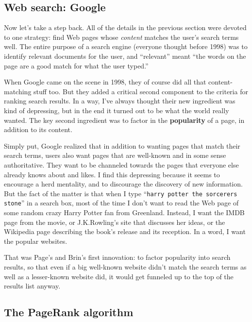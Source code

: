 \begin{alttitles}
\subsection{Web search: Google}

Now let's take a step back. All of the details in the previous section were
devoted to one strategy: find Web pages whose \textit{content} matches the
user's search terms well. The entire purpose of a search engine (everyone
thought before 1998) was to identify relevant documents for the user, and
``relevant'' meant ``the words on the page are a good match for what the user
typed.''


When Google came on the scene in 1998, they of course did all that
content-matching stuff too. But they added a critical second component to the
criteria for ranking search results. In a way, I've always thought their new
ingredient was kind of depressing, but in the end it turned out to be what
the world really wanted. The key second ingredient was to factor in the
\textbf{popularity} of a page, in addition to its content.


Simply put, Google realized that in addition to wanting pages that match their
search terms, users also want pages that are well-known and in some sense
authoritative. They want to be channeled towards the pages that everyone else
already knows about and likes. I find this depressing because it seems to
encourage a herd mentality, and to discourage the discovery of new information.
But the fact of the matter is that when I type ``\texttt{harry potter the
sorcerers stone}'' in a search box, most of the time I don't want to read the
Web page of some random crazy Harry Potter fan from Greenland. Instead, I want
the IMDB page from the movie, or J.K.Rowling's site that discusses her ideas,
or the Wikipedia page describing the book's release and its reception. In a
word, I want the popular websites.

That was Page's and Brin's first innovation: to factor popularity into search
results, so that even if a big well-known website didn't match the search terms
as well as a lesser-known website did, it would get funneled up to the top of
the results list anyway.

\subsection{The PageRank algorithm}


\end{alttitles}

